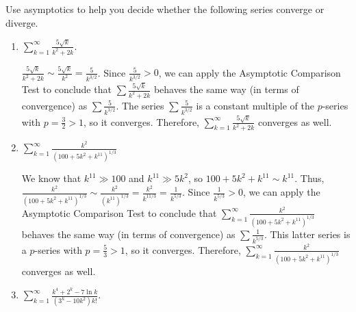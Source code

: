 \documentclass[main]{subfiles}
\begin{document}
\begin{enumerate}[resume]
Use asymptotics to help you decide whether the following series converge
or diverge.

\begin{enumerate}
  \item %
  \begin{problem}[\vfill]
  $\displaystyle \sum_{k=1}^\infty \frac{5 \sqrt{k}}{k^2 + 2k}$.
  \end{problem}

  \begin{solution}
  $\displaystyle \frac{5 \sqrt{k}}{k^2 + 2k} \sim \frac{5
  \sqrt{k}}{k^2} = \frac{5}{k^{3/2}}$.  Since $\displaystyle
  \frac{5}{k^{3/2}} > 0$, we can apply the Asymptotic Comparison Test
  to conclude that $\displaystyle \sum \frac{5 \sqrt{k}}{k^2 + 2k}$
  behaves the same way (in terms of convergence) as $\displaystyle
  \sum \frac{5}{k^{3/2}}$.  The series $\displaystyle \sum
  \frac{5}{k^{3/2}}$ is a constant multiple of the $p$-series with $p
  = \frac{3}{2} > 1$, so it converges.  Therefore, $\displaystyle
  \sum_{k=1}^\infty \frac{5 \sqrt{k}}{k^2 + 2k}$ converges as well.
  \end{solution}
  
  
  \item
  \begin{problem}[\vfill]
  $\displaystyle \sum_{k=1}^\infty \frac{k^2}{(100 + 5k^2 +
  k^{11})^{1/3}}$
  \end{problem}

  \begin{solution}
  We know that $k^{11} \gg 100$ and $k^{11} \gg 5k^2$, so $100 + 5k^2
  + k^{11} \sim k^{11}$.  Thus, $\displaystyle \frac{k^2}{(100 + 5k^2
  + k^{11})^{1/3}} \sim \frac{k^2}{\left( k^{11} \right)^{1/3}} =
  \frac{k^2}{k^{11/3}} = \frac{1}{k^{5/3}}$.  Since $\displaystyle
  \frac{1}{k^{5/3}} > 0$, we can apply the Asymptotic Comparison Test
  to conclude that $\displaystyle \sum_{k=1}^\infty \frac{k^2}{(100 +
  5k^2 + k^{11})^{1/3}}$ behaves the same way (in terms of
  convergence) as $\displaystyle \sum \frac{1}{k^{5/3}}$.  This latter
  series is a $p$-series with $\displaystyle p = \frac{5}{3} > 1$, so
  it converges.  Therefore, $\displaystyle \sum_{k=1}^\infty
  \frac{k^2}{(100 + 5k^2 + k^{11})^{1/3}}$ converges as well.
  \end{solution}

  \item
  \begin{problem}[\vfill]
  $\displaystyle \sum_{k=1}^\infty \frac{k^4 + 2^k - 7 \ln k}{(3^k -
  10 k^2) k!}$.
  \end{problem}


\end{enumerate}
\end{enumerate}
\end{document}
